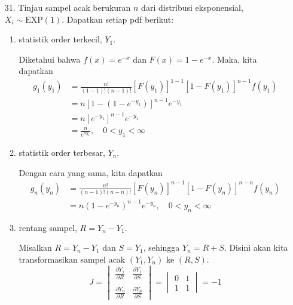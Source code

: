 \documentclass{exam}
\newcommand{\del}{\partial}
\begin{document}
\begin{enumerate}
        \item [31.] Tinjau sampel acak berukuran $n$ dari distribusi eksponensial, $X_i\sim \text{EXP}(1)$. Dapatkan setiap pdf berikut:
        \begin{enumerate}
            \item statistik order terkecil, $Y_1$.
            \begin{solution}
                Diketahui bahwa $f(x)=e^{-x}$ dan $F(x)=1-e^{-x}$. Maka, kita dapatkan
                \begin{align*}
                    g_1(y_1) &= \frac{n!}{(1-1)!(n-1)!}[F(y_1)]^{1-1}[1-F(y_1)]^{n-1}f(y_1)\\
                    &= n [1-(1-e^{-y_1})]^{n-1}e^{-y_1}\\
                    &= n[e^{-y_1}]^{n-1}e^{-y_1}\\
                    &= \frac{n}{e^{ny_1}},\quad 0<y_1<\infty
                \end{align*}
            \end{solution}
            \item statistik order terbesar, $Y_n$.
            \begin{solution}
                Dengan cara yang sama, kita dapatkan
                \begin{align*}
                    g_n(y_n) &= \frac{n!}{(n-1)!(n-n)!}[F(y_n)]^{n-1}[1-F(y_n)]^{n-n}f(y_n)\\
                    &= n(1-e^{-y_n})^{n-1}e^{-y_n},\quad 0<y_n<\infty
                \end{align*}
            \end{solution}
            \item rentang sampel, $R=Y_n-Y_1$.
            \begin{solution}
                Misalkan $R=Y_n-Y_1$ dan $S=Y_1$, sehingga $Y_n=R+S$. Disini akan kita transformasikan sampel acak $(Y_1,Y_n)$ ke $(R,S)$.
                \[J=\begin{vmatrix}
                    \displaystyle\frac{\del Y_1}{\del R} & \displaystyle\frac{\del Y_1}{\del S}\\\\
                    \displaystyle\frac{\del Y_n}{\del R} & \displaystyle\frac{\del Y_n}{\del S}
                \end{vmatrix}=\begin{vmatrix}
                    0 & 1\\
                    1 & 1
                \end{vmatrix}=-1\] 

\end{solution}
\end{enumerate}
\end{enumerate}
\end{document}
